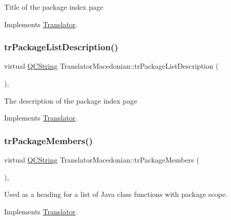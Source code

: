 Title of the package index page 

Implements \mbox{\hyperlink{class_translator}{Translator}}.

\mbox{\label{class_translator_macedonian_af2df2a27b036fce26befff54f38c5017}} 
\subsubsection{\texorpdfstring{trPackageListDescription()}{trPackageListDescription()}}
{\footnotesize\ttfamily virtual \mbox{\hyperlink{class_q_c_string}{Q\+C\+String}} Translator\+Macedonian\+::tr\+Package\+List\+Description (\begin{DoxyParamCaption}{ }\end{DoxyParamCaption})\hspace{0.3cm}{\ttfamily [inline]}, {\ttfamily [virtual]}}

The description of the package index page 

Implements \mbox{\hyperlink{class_translator}{Translator}}.

\mbox{\label{class_translator_macedonian_a6a9f1e1a9b6780a447eeef787e3f2099}} 
\subsubsection{\texorpdfstring{trPackageMembers()}{trPackageMembers()}}
{\footnotesize\ttfamily virtual \mbox{\hyperlink{class_q_c_string}{Q\+C\+String}} Translator\+Macedonian\+::tr\+Package\+Members (\begin{DoxyParamCaption}{ }\end{DoxyParamCaption})\hspace{0.3cm}{\ttfamily [inline]}, {\ttfamily [virtual]}}

Used as a heading for a list of Java class functions with package scope. 

Implements \mbox{\hyperlink{class_translator}{Translator}}.

\mbox{\label{class_translator_macedonian_a7c6e1d67434dc2208e55934de5ec5987}} 
